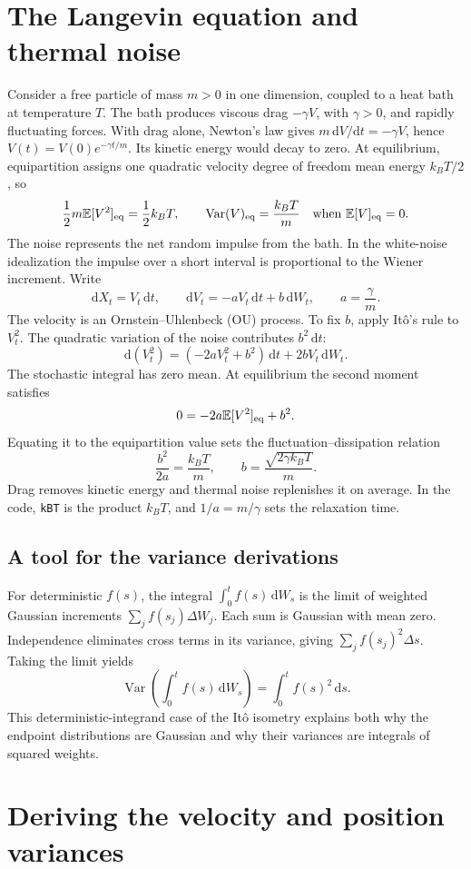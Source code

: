 \documentclass[11pt,a4paper]{article}
\newcommand{\E}{\mathbb E}
\newcommand{\Var}{\operatorname{Var}}
\newcommand{\dd}{\,\mathrm d}
\begin{document}
\section{The Langevin equation and thermal noise}
Consider a free particle of mass \(m>0\) in one dimension, coupled to a heat bath
at temperature \(T\). The bath produces viscous drag \(-\gamma V\), with
\(\gamma>0\), and rapidly fluctuating forces. With drag alone, Newton's law gives
\(m\,\mathrm dV/\mathrm dt=-\gamma V\), hence
\(V(t)=V(0)e^{-\gamma t/m}\). Its kinetic energy would decay to zero.
At equilibrium, equipartition assigns one quadratic velocity degree of freedom
mean energy \(k_BT/2\), so
\[
 \frac12m\E[V^2]_{\rm eq}=\frac12 k_BT,
 \qquad \Var(V)_{\rm eq}=\frac{k_BT}{m}
 \quad\text{when }\E[V]_{\rm eq}=0.
\]
The noise represents the net random impulse from the bath. In the white-noise
idealization the impulse over a short interval is proportional to the
Wiener increment. Write
\[
 \mathrm dX_t=V_t\dd t,\qquad
 \mathrm dV_t=-aV_t\dd t+b\dd W_t,\qquad a=\frac{\gamma}{m}.
\]
The velocity is an Ornstein--Uhlenbeck (OU) process. To fix \(b\), apply It\^o's
rule to \(V_t^2\). The quadratic variation of the noise contributes \(b^2\dd t\):
\[
 \mathrm d(V_t^2)=(-2aV_t^2+b^2)\dd t+2bV_t\dd W_t.
\]
The stochastic integral has zero mean. At equilibrium the second moment
satisfies \[0=-2a\E[V^2]_{\rm eq}+b^2.\] Equating it to the equipartition value
sets the fluctuation--dissipation relation
\[
 \frac{b^2}{2a}=\frac{k_BT}{m},
 \qquad
 b=\frac{\sqrt{2\gamma k_BT}}{m}.
\]
Drag removes kinetic energy and thermal noise replenishes it on average.
In the code, \texttt{kBT} is the product \(k_BT\), and \(1/a=m/\gamma\)
sets the relaxation time.

\subsection*{A tool for the variance derivations}
For deterministic \(f(s)\), the integral \(\int_0^t f(s)\dd W_s\) is the
limit of weighted Gaussian increments \(\sum_j f(s_j)\Delta W_j\).
Each sum is Gaussian with mean zero. Independence eliminates cross terms
in its variance, giving \(\sum_j f(s_j)^2\Delta s\). Taking the limit yields
\[
 \Var\!\left(\int_0^t f(s)\dd W_s\right)=\int_0^t f(s)^2\dd s.
\]
This deterministic-integrand case of the It\^o isometry explains both why
the endpoint distributions are Gaussian and why their variances are integrals
of squared weights.
\newpage

\section{Deriving the velocity and position variances}
\end{document}
